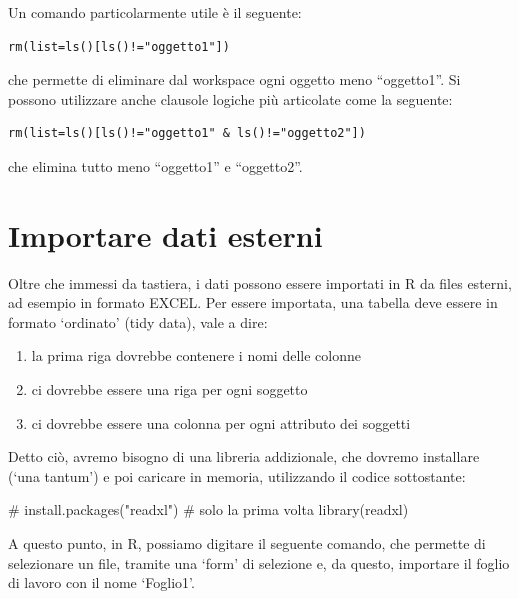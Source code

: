 \documentclass[a4paper,12pt,oneside]{book}
\providecommand{\tightlist}{%
  \setlength{\itemsep}{0pt}\setlength{\parskip}{0pt}}
\newenvironment{Shaded}{\begin{snugshade}}{\end{snugshade}}
\newcommand{\CommentTok}[1]{#1}
\newcommand{\FunctionTok}[1]{#1}
\newcommand{\NormalTok}[1]{#1}
\begin{document}
Un comando particolarmente utile è il seguente:

\begin{verbatim}
rm(list=ls()[ls()!="oggetto1"])
\end{verbatim}

che permette di eliminare dal workspace ogni oggetto meno ``oggetto1''. Si possono utilizzare anche clausole logiche più articolate come la seguente:

\begin{verbatim}
rm(list=ls()[ls()!="oggetto1" & ls()!="oggetto2"])
\end{verbatim}

che elimina tutto meno ``oggetto1'' e ``oggetto2''.

\hypertarget{importare-dati-esterni}{%
\section{Importare dati esterni}\label{importare-dati-esterni}}

Oltre che immessi da tastiera, i dati possono essere importati in R da files esterni, ad esempio in formato EXCEL. Per essere importata, una tabella deve essere in formato `ordinato' (tidy data), vale a dire:

\begin{enumerate}
\def\labelenumi{\arabic{enumi}.}
\tightlist
\item
  la prima riga dovrebbe contenere i nomi delle colonne
\item
  ci dovrebbe essere una riga per ogni soggetto
\item
  ci dovrebbe essere una colonna per ogni attributo dei soggetti
\end{enumerate}

Detto ciò, avremo bisogno di una libreria addizionale, che dovremo installare (`una tantum') e poi caricare in memoria, utilizzando il codice sottostante:

\begin{Shaded}
\begin{Highlighting}[]
\CommentTok{\# install.packages("readxl") \# solo la prima volta}
\FunctionTok{library}\NormalTok{(readxl)}
\end{Highlighting}
\end{Shaded}

A questo punto, in R, possiamo digitare il seguente comando, che permette di selezionare un file, tramite una `form' di selezione e, da questo, importare il foglio di lavoro con il nome `Foglio1'.
\end{document}
